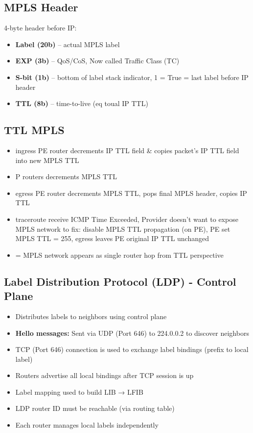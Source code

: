 \begin{multicols*}{5}
		\subsection{MPLS Header}
		4-byte header before IP:
		\begin{itemize}
			\item \textbf{Label (20b)} – actual MPLS label
			\item \textbf{EXP (3b)} – QoS/CoS, Now called Traffic Class (TC)
			\item \textbf{S-bit (1b)} – bottom of label stack indicator, 1 = True = last label before IP header
			\item \textbf{TTL (8b)} – time-to-live (eq toual IP TTL)
		\end{itemize}
		\subsection{TTL MPLS}
		\begin{itemize}
			\item ingress PE router decrements IP TTL field \& copies packet’s IP TTL field into new MPLS TTL
			\item P routers decrements MPLS TTL
			\item egress PE router decrements MPLS TTL, pops final MPLS header, copies IP TTL
			\item traceroute receive ICMP Time Exceeded, Provider doesn't want to expose MPLS network to fix: disable MPLS TTL propagation (on PE), PE set MPLS TTL = 255, egress leaves PE original IP TTL unchanged
			\item = MPLS network appears as single router hop from TTL perspective
		\end{itemize}
		\subsection{Label Distribution Protocol (LDP) - Control Plane}
		\begin{itemize}
			\item Distributes labels to neighbors using control plane
			\item \textbf{Hello messages:} Sent via UDP (Port 646) to 224.0.0.2 to discover neighbors
			\item TCP (Port 646) connection is used to exchange label bindings (prefix to local label)
			\item Routers advertise all local bindings after TCP session is up
			\item Label mapping used to build LIB → LFIB
			\item LDP router ID must be reachable (via routing table)
			\item Each router manages local labels independently
		\end{itemize}
		

\end{multicols*}
